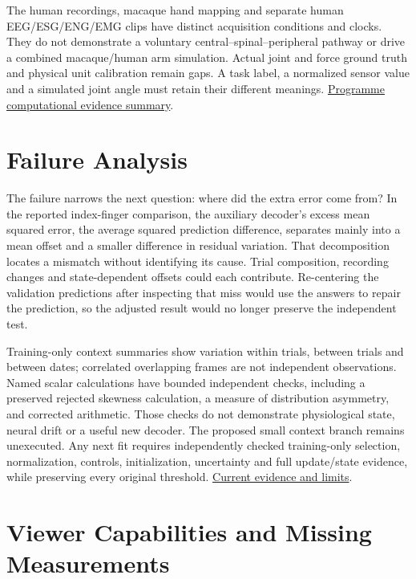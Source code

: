 The human recordings, macaque hand mapping and separate human EEG/ESG/ENG/EMG clips have distinct acquisition conditions and clocks. They do not demonstrate a voluntary central--spinal--peripheral pathway or drive a combined macaque/human arm simulation. Actual joint and force ground truth and physical unit calibration remain gaps. A task label, a normalized sensor value and a simulated joint angle must retain their different meanings. \href{research-evidence.json}{Programme computational evidence summary}.\par

\section{Failure Analysis}

The failure narrows the next question: where did the extra error come from? In the reported index-finger comparison, the auxiliary decoder's excess mean squared error, the average squared prediction difference, separates mainly into a mean offset and a smaller difference in residual variation. That decomposition locates a mismatch without identifying its cause. Trial composition, recording changes and state-dependent offsets could each contribute. Re-centering the validation predictions after inspecting that miss would use the answers to repair the prediction, so the adjusted result would no longer preserve the independent test.\par

Training-only context summaries show variation within trials, between trials and between dates; correlated overlapping frames are not independent observations. Named scalar calculations have bounded independent checks, including a preserved rejected skewness calculation, a measure of distribution asymmetry, and corrected arithmetic. Those checks do not demonstrate physiological state, neural drift or a useful new decoder. The proposed small context branch remains unexecuted. Any next fit requires independently checked training-only selection, normalization, controls, initialization, uncertainty and full update/state evidence, while preserving every original threshold. \href{research-evidence.json}{Current evidence and limits}.\par

\section{Viewer Capabilities and Missing Measurements}

